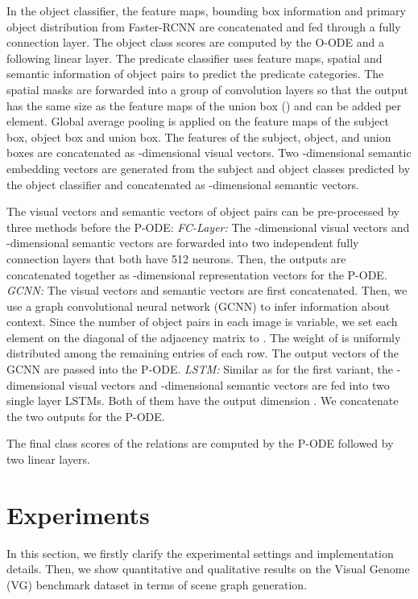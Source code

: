 \documentclass[runningheads]{llncs}
\begin{document}
In the object classifier, the feature maps, bounding box information and primary object distribution from Faster-RCNN are concatenated and fed through a fully connection layer. The object class scores are computed by the O-ODE and a following linear layer. The predicate classifier uses feature maps, spatial and semantic information of object pairs to predict the predicate categories. 
The spatial masks are forwarded into a group of convolution layers so that the output has the same size as the feature maps of the union box () and can be added per element. Global average pooling is applied on the feature maps of the subject box, object box and union box. The features of the subject, object, and union boxes are concatenated as  -dimensional visual vectors. Two -dimensional semantic embedding vectors are generated from the subject and object classes predicted by the object classifier and concatenated as -dimensional semantic vectors. 

The visual vectors and semantic vectors of object pairs can be pre-processed by three methods before the P-ODE:  \emph{FC-Layer:} The -dimensional visual vectors and -dimensional semantic vectors are forwarded into two independent fully connection layers that both have 512 neurons. Then, the outputs are concatenated together as -dimensional representation vectors for the P-ODE. \emph{GCNN:} The visual vectors and semantic vectors are first concatenated. Then, we use a graph convolutional neural network (GCNN) to infer information about context. Since the number of object pairs in each image is variable, we set each element on the diagonal of the adjacency matrix to . The weight of  is uniformly distributed among the remaining entries of each row. The output vectors of the GCNN are passed into the P-ODE. \emph{LSTM:} Similar as for the first variant, the -dimensional visual vectors and -dimensional semantic vectors are fed into two single layer LSTMs. Both of them have the output dimension . We concatenate the two outputs for the P-ODE. 

The final class scores of the relations are computed by the P-ODE followed by two linear layers.


\section{Experiments}
\label{Sec:Exps}

In this section, we firstly clarify the experimental settings
and implementation details. 
Then, we show quantitative and qualitative results on the Visual Genome (VG) benchmark dataset \cite{krishna2017visual} in terms of scene graph generation. 
\end{document}
